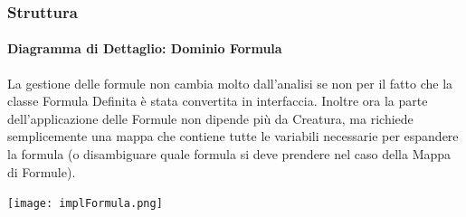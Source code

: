 \documentclass[a4paper, 11pt]{article}
\begin{document}
\subsubsection{Struttura}

\paragraph{Diagramma di Dettaglio: Dominio Formula\\}
La gestione delle formule non cambia molto dall'analisi se non per il fatto che la classe Formula Definita è stata convertita in interfaccia. Inoltre ora la parte dell'applicazione delle Formule non dipende più da Creatura, ma richiede semplicemente una mappa che contiene tutte le variabili necessarie per espandere la formula (o disambiguare quale formula si deve prendere nel caso della Mappa di Formule).
\vspace{1em}
    \begin{center}
        \centering
        \texttt{[image: implFormula.png]}
        \label{fig:implFormula}
    \end{center}

\newpage
\end{document}
